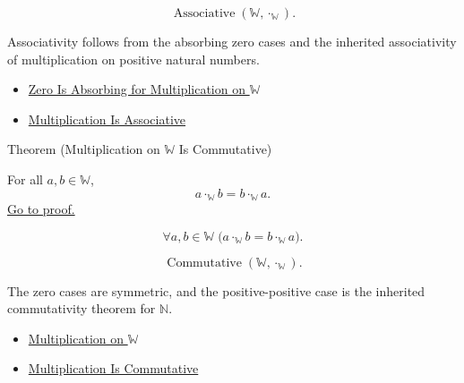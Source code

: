 \begin{remark*}
\[
\operatorname{Associative}(\mathbb{W},\cdot_{\mathbb{W}}).
\]
\end{remark*}

\begin{remark*}[Interpretation]
Associativity follows from the absorbing zero cases and the inherited
associativity of multiplication on positive natural numbers.
\end{remark*}

\begin{dependencies}
\begin{itemize}
  \item \hyperref[thm:zero-absorbing-for-multiplication-on-w]{Zero Is Absorbing for Multiplication on $\mathbb{W}$}
  \item \hyperref[thm:multiplication-associative]{Multiplication Is Associative}
\end{itemize}
\end{dependencies}

\begin{theorembox}{Theorem (Multiplication on \texorpdfstring{$\mathbb{W}$}{W} Is Commutative)}
\begin{theorem}
\label{thm:multiplication-on-w-commutative}
For all $a,b\in\mathbb{W}$,
\[
a\cdot_{\mathbb{W}}b=b\cdot_{\mathbb{W}}a.
\]
\hyperref[prf:multiplication-on-w-commutative]{Go to proof.}
\end{theorem}
\end{theorembox}

\begin{remark*}
\[
\forall a,b\in\mathbb{W}\;
\bigl(a\cdot_{\mathbb{W}}b=b\cdot_{\mathbb{W}}a\bigr).
\]
\end{remark*}

\begin{remark*}
\[
\operatorname{Commutative}(\mathbb{W},\cdot_{\mathbb{W}}).
\]
\end{remark*}

\begin{remark*}[Interpretation]
The zero cases are symmetric, and the positive-positive case is the inherited
commutativity theorem for $\mathbb{N}$.
\end{remark*}

\begin{dependencies}
\begin{itemize}
  \item \hyperref[def:multiplication-on-w]{Multiplication on $\mathbb{W}$}
  \item \hyperref[thm:multiplication-commutative]{Multiplication Is Commutative}
\end{itemize}
\end{dependencies}

